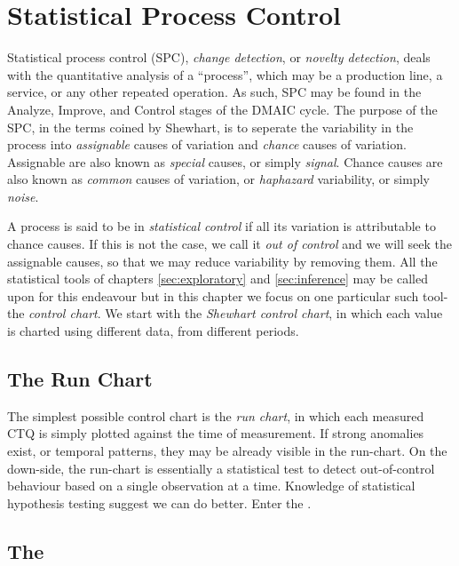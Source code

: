 \chapter[Statistical Process Control]{Statistical Process Control}
\label{sec:spc}

Statistical process control (SPC), \aka \emph{change detection}, or \emph{novelty detection}, deals with the quantitative analysis of a ``process'', which may be a production line, a service, or any other repeated operation.
As such, SPC may be found in the Analyze, Improve, and Control stages of the DMAIC cycle.
The purpose of the SPC, in the terms coined by Shewhart, is to seperate the variability in the process into \emph{assignable} causes of variation and \emph{chance} causes of variation.
Assignable are also known as \emph{special} causes, or simply \emph{signal}.
Chance causes are also known as \emph{common} causes of variation, or \emph{haphazard} variability, or simply \emph{noise}.
 
A process is said to be in \emph{statistical control} if all its variation is attributable to chance causes.
If this is not the case, we call it \emph{out of control} and we will seek the assignable causes, so that we may reduce variability by removing them.
All the statistical tools of chapters \ref{sec:exploratory} and \ref{sec:inference} may be called upon for this endeavour but in this chapter we focus on one particular such tool- the \emph{control chart}.
We start with the \emph{Shewhart control chart}, in which each value is charted using different data, from different periods. 



\section{The Run Chart}
The simplest possible control chart is the \emph{run chart}, in which each measured CTQ is simply plotted against the time of measurement.
If strong anomalies exist, or temporal patterns, they may be already visible in the run-chart.
On the down-side, the run-chart is essentially a statistical test to detect out-of-control behaviour based on a single observation at a time.
Knowledge of statistical hypothesis testing suggest we can do better. 
Enter the \barxChart. 


\section[The X-bar Chart]{The \barxChart}
\sectionmark{\barxChart}


